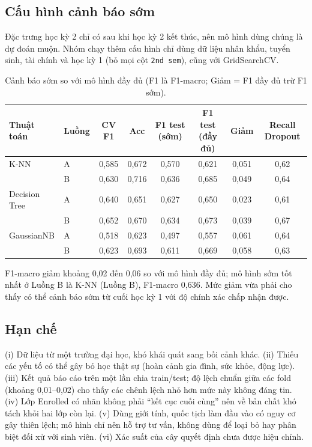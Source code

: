 \documentclass[12pt,a4paper]{article}
\begin{document}
\subsection{Cấu hình cảnh báo sớm}
Đặc trưng học kỳ 2 chỉ có sau khi học kỳ 2 kết thúc, nên mô hình dùng chúng là dự đoán muộn. Nhóm chạy thêm cấu hình chỉ dùng dữ liệu nhân khẩu,
tuyển sinh, tài chính và học kỳ 1 (bỏ mọi cột \texttt{2nd sem}), cũng với GridSearchCV.
\begin{table}[H]\centering\small
\begin{tabular}{@{}llcccccc@{}}\toprule
Thuật toán & Luồng & CV F1 & Acc & F1 test (sớm) & F1 test (đầy đủ) & Giảm & Recall Dropout\\\midrule
K-NN & A & 0,585 & 0,672 & 0,570 & 0,621 & 0,051 & 0,62 \\
 & B & 0,630 & 0,716 & 0,636 & 0,685 & 0,049 & 0,64 \\
Decision Tree & A & 0,640 & 0,651 & 0,627 & 0,650 & 0,023 & 0,61 \\
 & B & 0,652 & 0,670 & 0,634 & 0,673 & 0,039 & 0,67 \\
GaussianNB & A & 0,518 & 0,623 & 0,497 & 0,557 & 0,061 & 0,64 \\
 & B & 0,623 & 0,693 & 0,611 & 0,669 & 0,058 & 0,63 \\
\bottomrule\end{tabular}\caption{Cảnh báo sớm so với mô hình đầy đủ (F1 là F1-macro; Giảm = F1 đầy đủ trừ F1 sớm).}\label{tab:ew}\end{table}
F1-macro giảm khoảng 0,02 đến 0,06 so với mô hình đầy đủ; mô hình sớm tốt nhất ở Luồng B là K-NN (Luồng B), F1-macro 0,636.
Mức giảm vừa phải cho thấy có thể cảnh báo sớm từ cuối học kỳ 1 với độ chính xác chấp nhận được.

\subsection{Hạn chế}
(i) Dữ liệu từ một trường đại học, khó khái quát sang bối cảnh khác. (ii) Thiếu các yếu tố có thể gây bỏ học thật sự (hoàn cảnh gia đình, sức khỏe,
động lực). (iii) Kết quả báo cáo trên một lần chia train/test; độ lệch chuẩn giữa các fold (khoảng 0,01--0,02) cho thấy các chênh lệch nhỏ hơn mức này không đáng tin.
(iv) Lớp Enrolled có nhãn không phải ``kết cục cuối cùng'' nên về bản chất khó tách khỏi hai lớp còn lại. (v) Dùng giới tính, quốc tịch làm đầu vào có nguy cơ
gây thiên lệch; mô hình chỉ nên hỗ trợ tư vấn, không dùng để loại bỏ hay phân biệt đối xử với sinh viên. (vi) Xác suất của cây quyết định chưa được hiệu chỉnh.
\end{document}
